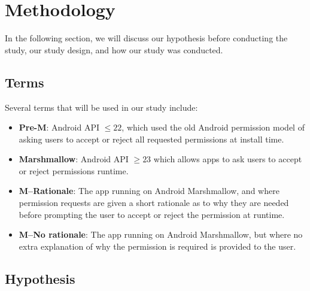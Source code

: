 \documentclass{sig-alternate-05-2015}
\newcommand{\pkm}[1]{\textcolor{magenta}{{\it [Pradeep: #1]}}}
\begin{document}


\section{Methodology} %
\label{sec: method}


In the following section, we will discuss our hypothesis before conducting the study, our study design, and how our study was conducted.

\subsection{Terms}
Several terms that will be used in our study include:

\begin{itemize}
	\setlength{\itemsep}{.8pt}
    	\setlength{\parskip}{0pt}
    	\setlength{\parsep}{0pt}
	\item \textbf{Pre-M}:  Android API $\leq 22$, which used the old Android permission model of asking users to accept or reject all requested permissions at install time.
	\item \textbf{Marshmallow}:  Android API $\geq 23$ which allows apps to ask users to accept or reject permissions runtime.
	\item \textbf{M--Rationale}:  The app running on Android Marshmallow, and where permission requests are given a short rationale as to why they are needed before prompting the user to accept or reject the permission at runtime.
	\item \textbf{M--No rationale}:  The app running on Android Marshmallow, but where no extra explanation of why the permission is required is provided to the user.


\end{itemize}


%


\subsection{Hypothesis}
\end{document}
